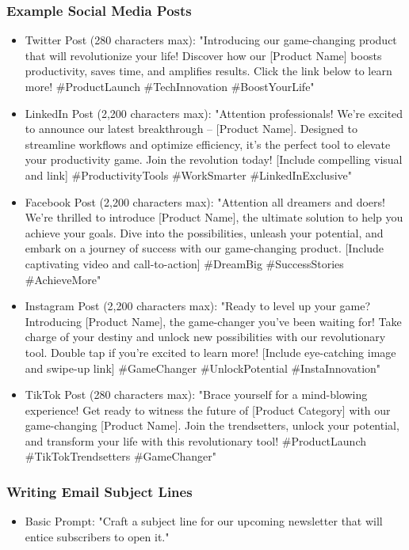 \begin{frame}[fragile]\frametitle{Example Social Media Posts}
{\tiny
\begin{itemize}
\item Twitter Post (280 characters max):
"Introducing our game-changing product that will revolutionize your life! Discover how our [Product Name] boosts productivity, saves time, and amplifies results. Click the link below to learn more! \#ProductLaunch \#TechInnovation \#BoostYourLife"
\item LinkedIn Post (2,200 characters max):
"Attention professionals! We're excited to announce our latest breakthrough – [Product Name]. Designed to streamline workflows and optimize efficiency, it's the perfect tool to elevate your productivity game. Join the revolution today! [Include compelling visual and link] \#ProductivityTools \#WorkSmarter \#LinkedInExclusive"
\item Facebook Post (2,200 characters max):
"Attention all dreamers and doers! We're thrilled to introduce [Product Name], the ultimate solution to help you achieve your goals. Dive into the possibilities, unleash your potential, and embark on a journey of success with our game-changing product. [Include captivating video and call-to-action] \#DreamBig \#SuccessStories \#AchieveMore"
\item Instagram Post (2,200 characters max):
"Ready to level up your game? Introducing [Product Name], the game-changer you've been waiting for! Take charge of your destiny and unlock new possibilities with our revolutionary tool. Double tap if you're excited to learn more! [Include eye-catching image and swipe-up link] \#GameChanger \#UnlockPotential \#InstaInnovation"
\item TikTok Post (280 characters max):
"Brace yourself for a mind-blowing experience! Get ready to witness the future of [Product Category] with our game-changing [Product Name]. Join the trendsetters, unlock your potential, and transform your life with this revolutionary tool! \#ProductLaunch \#TikTokTrendsetters \#GameChanger"
\end{itemize}
}
\end{frame}

\begin{frame}[fragile]\frametitle{Writing Email Subject Lines}
\begin{itemize}
\item Basic Prompt: "Craft a subject line for our upcoming newsletter that will entice subscribers to open it."
\end{itemize}
\end{frame}

